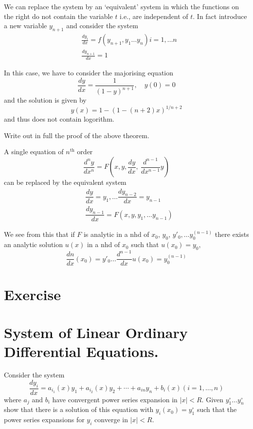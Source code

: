 \begin{remark*}
We can replace the system by an `equivalent' system in which the functions on the right do not contain the variable $t$ i.e., are independent of $t$. In fact introduce a new variable $y_{n+1}$ and consider the system
\begin{align*}
& \frac{dy_{i}}{dx}=f(y_{n+1},y_{1}\ldots y_{n})i=1,\ldots n\\[3pt]
& \frac{dy_{n+1}}{dx}=1
\end{align*}

In this case, we have to consider the majorising equation
$$
\dfrac{dy}{dx}=\dfrac{1}{(1-y)^{n+1}},\quad y(0)=0
$$
and the solution is given by
$$
y(x)=1-(1-(n+2)x)^{1/n+2}
$$
and thus does not contain logorithm.
\end{remark*}

\begin{exer*}
Write out in full the proof of the above theorem.
\end{exer*}

\begin{remark*}
A single equation of $n^{\text{th}}$ order
$$
\frac{d^{n}y}{dx^{n}}=F\left(x,y,\dfrac{dy}{dx}, \ \dfrac{d^{n-1}}{dx^{n-1}}y\right)
$$
can be replaced by the equivalent system
\begin{align*}
& \dfrac{dy}{dx}=y_{1},\ldots \dfrac{dy_{n-2}}{dx}=y_{n-1}\\[3pt]
& \dfrac{dy_{n-1}}{dx}=F(x,y,y_{1},\ldots y_{n-1})
\end{align*}\pageoriginale

We see from this that if $F$ is analytic in a nhd of $x_{0}$, $y_{0}$, $y'_{0},\ldots y_{0}^{(n-1)}$ there exists an analytic solution $u(x)$ in a nhd of $x_{0}$ such that $u(x_{0})=y_{0}$,
$$
\frac{dn}{dx}(x_{0})=y'_{0}\ldots \dfrac{d^{n-1}}{dx}u(x_{0})=y_{0}^{(n-1)}
$$
\end{remark*}

\section*{Exercise}

\section*{System of Linear Ordinary Differential Equations.}

Consider the system
$$
\dfrac{dy_{i}}{dx}=a_{i_{1}}(x)y_{1}+a_{i_{2}}(x)y_{2}+\cdots+ a_{in}y_{n}+b_{i}(x)(i=1,\ldots,n)
$$
where $a_{j}$ and $b_{i}$ have convergent power series expansion in $|x|<R$. Given $y^{\circ}_{1}\ldots y^{\circ}_{n}$ show that there is a solution of this equation with $y_{i}(x_{0})=y^{\circ}_{1}$ such that the power series expansions for $y_{i}$ converge in $|x|<R$.


